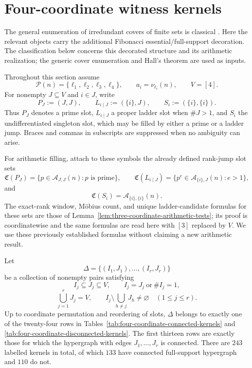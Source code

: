 \section{Four-coordinate witness kernels}\label{sec:four-coordinate-kernels}

The general enumeration of irredundant covers of finite sets is classical
\cite{HearneWagner1973MinimalCovers}.  Here the relevant objects carry the
additional Fibonacci essential/full-support decoration.  The classification
below concerns this decorated structure and its arithmetic realization; the
generic cover enumeration and Hall's theorem are used as inputs.

Throughout this section assume
\[
 \mathcal P(n)=\{\ell_1,\ell_2,\ell_3,\ell_4\},\qquad
 a_i=\nu_{\ell_i}(n),\qquad V=[4].
\]
For nonempty $J\subseteq V$ and $i\in J$, write
\[
 P_J:=(J,J),\qquad L_{i\mid J}:=(\{i\},J),
 \qquad S_i:=(\{i\},\{i\}).
\]
Thus $P_J$ denotes a prime slot, $L_{i\mid J}$ a proper ladder slot when
$\#J>1$, and $S_i$ the undifferentiated singleton slot, which may be filled by
either a prime or a ladder jump.  Braces and commas in subscripts are
suppressed when no ambiguity can arise.

For arithmetic filling, attach to these symbols the already defined rank-jump
slot sets
\[
 \mathfrak C(P_J)=\{p\in\mathcal A_{J,J}(n):p\text{ is prime}\},
 \qquad
 \mathfrak C(L_{i\mid J})=
 \{p^e\in\mathcal A_{\{i\},J}(n):e>1\},
\]
and
\[
 \mathfrak C(S_i)=\mathcal A_{\{i\},\{i\}}(n).
\]
The exact-rank window, M\"obius count, and unique ladder-candidate formulas
for these sets are those of
Lemma~\ref{lem:three-coordinate-arithmetic-tests}; its proof is
coordinatewise and the same formulas are read here with $[3]$ replaced by
$V$.  We use these previously established formulas without claiming a new
arithmetic result.

\begin{theorem}
\label{thm:four-coordinate-kernel-classification}
Let
\[
 \Delta=\{(I_1,J_1),\ldots,(I_r,J_r)\}
\]
be a collection of nonempty pairs satisfying
\[
 I_j\subseteq J_j\subseteq V,\qquad
 I_j=J_j\ \text{or}\ \#I_j=1,
\]
\[
 \bigcup_{j=1}^rJ_j=V,
 \qquad
 I_j\setminus\bigcup_{h\ne j}J_h\ne\varnothing
 \quad(1\le j\le r).
\]
Up to coordinate permutation and reordering of slots, $\Delta$ belongs to
exactly one of the twenty-four rows in
Tables~\ref{tab:four-coordinate-connected-kernels} and
\ref{tab:four-coordinate-disconnected-kernels}.  The first thirteen rows are
exactly those for which the hypergraph with edges $J_1,\ldots,J_r$ is
connected.  There are $243$ labelled kernels in total, of which $133$ have
connected full-support hypergraph and $110$ do not.
\end{theorem}

